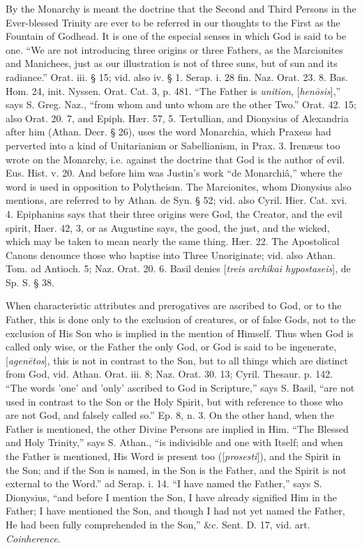 By the Monarchy is meant the doctrine that the
Second and Third Persons in the Ever-blessed Trinity are ever to be
referred in our thoughts to the First as the Fountain of Godhead. It
is one of the especial senses in which God is said to be one. ``We are
not introducing three origins or three Fathers, as the Marcionites and
Manichees, just as our illustration is not of three suns, but of sun
and its radiance.'' Orat. iii. § 15; vid. also iv. § 1. Serap. i. 28
fin. Naz. Orat. 23. 8. Bas. Hom. 24, init. Nyssen. Orat. Cat. 3, p.
481. ``The Father is \emph{unition}, [\emph{hen\={o}sis}],'' says S.
Greg. Naz., ``from whom and unto whom are the other Two.'' Orat. 42. 15;
also Orat. 20. 7, and Epiph. Hær. 57, 5. Tertullian, and
Dionysius of Alexandria after him (Athan. Decr. § 26), uses the word
Monarchia, which Praxeas had perverted into a kind of Unitarianism or
Sabellianism, in Prax. 3. Irenæus too wrote on the Monarchy, i.e.
against the doctrine that God is the author of evil. Eus. Hist. v. 20.
And before him was Justin's work ``de Monarchiâ,'' where the word is
used in opposition to Polytheism. The Marcionites, whom Dionysius also
mentions, are referred to by Athan. de Syn. § 52; vid. also Cyril.
Hier. Cat. xvi. 4. Epiphanius says that their three origins were God,
the Creator, and the evil spirit, Haer. 42, 3, or as Augustine says,
the good, the just, and the wicked, which may be taken to mean nearly
the same thing. Hær. 22. The Apostolical Canons denounce those who
baptise into Three Unoriginate; vid. also Athan. Tom. ad Antioch. 5;
Naz. Orat. 20. 6. Basil denies [\emph{treis
archikai hypostaseis}],
de Sp. S. § 38.

When characteristic attributes and prerogatives
are ascribed to God, or to the Father, this is done only to the
exclusion of creatures, or of false Gods, not to the exclusion of His
Son who is implied in the mention of Himself. Thus when God is called
only wise, or the Father the only God, or God is said to be
ingenerate, [\emph{agen\={e}tos}], this is not in contrast to the Son, but to all things which are
distinct from God, vid. Athan. Orat. iii. 8; Naz. Orat. 30. 13; Cyril.
Thesaur. p. 142. ``The words 'one' and 'only' ascribed to God in
Scripture,'' says S. Basil, ``are not used in contrast to the Son or the
Holy Spirit, but with reference to those who are not God, and falsely
called so.'' Ep. 8, n. 3. On the other hand, when the Father is
mentioned, the other Divine Persons are implied in Him. ``The Blessed
and Holy Trinity,'' says S. Athan., ``is indivisible and one with
Itself; and when the Father is mentioned, His Word is present too
([\emph{prosesti}]), and the Spirit in the Son; and if the Son is named, in the
Son is the Father, and the Spirit is not external to the Word.'' ad
Serap. i. 14. ``I have named the Father,'' says S. Dionysius, ``and
before I mention the Son, I have already signified Him in the Father;
I have mentioned the Son, and though I had not yet named the Father,
He had been fully comprehended in the Son,'' \&c. Sent. D. 17, vid.
art. \emph{Coinherence}.

